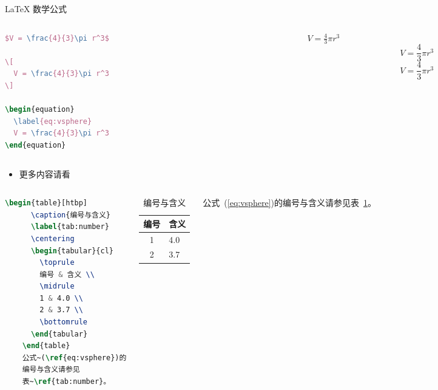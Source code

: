 \documentclass{beamer}
\begin{document}
\begin{frame}[fragile]{\LaTeX{} 数学公式}
    \begin{columns}
        \begin{column}{.55\textwidth}
            \begin{lstlisting}[language=TeX]
$V = \frac{4}{3}\pi r^3$

\[
  V = \frac{4}{3}\pi r^3
\]

\begin{equation}
  \label{eq:vsphere}
  V = \frac{4}{3}\pi r^3
\end{equation}
\end{lstlisting}
        \end{column}
        \begin{column}{.4\textwidth}
            $V = \frac{4}{3}\pi r^3$
            \[
                V = \frac{4}{3}\pi r^3
            \]
            \begin{equation}
                \label{eq:vsphere}
                V = \frac{4}{3}\pi r^3
            \end{equation}
        \end{column}
    \end{columns}
    \begin{itemize}
        \item 更多内容请看 \href{https://zh.wikipedia.org/wiki/Help:数学公式}{\color{purple}{这里}}
    \end{itemize}
\end{frame}

\begin{frame}[fragile]
    \begin{columns}
        \begin{lstlisting}[language=TeX]
    \begin{table}[htbp]
      \caption{编号与含义}
      \label{tab:number}
      \centering
      \begin{tabular}{cl}
        \toprule
        编号 & 含义 \\
        \midrule
        1 & 4.0 \\
        2 & 3.7 \\
        \bottomrule
      \end{tabular}
    \end{table}
    公式~(\ref{eq:vsphere})的
    编号与含义请参见
    表~\ref{tab:number}。
\end{lstlisting}
        \begin{table}[htpb]
            \centering
            \caption{编号与含义}
            \label{tab:number}
            \begin{tabular}{cl}\toprule
                编号 & 含义 \\\midrule
                1    & 4.0  \\
                2    & 3.7  \\\bottomrule
            \end{tabular}
        \end{table}
        \normalsize 公式~(\ref{eq:vsphere})的编号与含义请参见表~\ref{tab:number}。
    \end{columns}
\end{frame}
\end{document}
